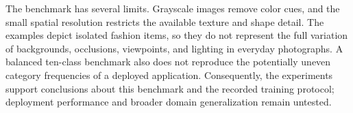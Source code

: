 The benchmark has several limits. Grayscale images remove color cues, and the small spatial resolution restricts the available texture and shape detail. The examples depict isolated fashion items, so they do not represent the full variation of backgrounds, occlusions, viewpoints, and lighting in everyday photographs. A balanced ten-class benchmark also does not reproduce the potentially uneven category frequencies of a deployed application. Consequently, the experiments support conclusions about this benchmark and the recorded training protocol; deployment performance and broader domain generalization remain untested.

\clearpage
